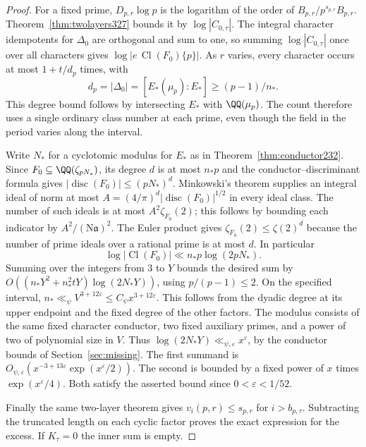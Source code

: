 \documentclass[a4paper,11pt]{article}
\theoremstyle{definition}
\theoremstyle{remark}
\numberwithin{equation}{section}
\newcommand{\Cl}{\operatorname{Cl}}
\begin{document}
\begin{proof}
For a fixed prime, \(D_{p,r}\log p\) is the logarithm
of the order of \(B_{p,r}/p^{s_{p,r}}B_{p,r}\).
Theorem~\ref{thm:twolayers327} bounds it by
\(\log |C_{0,\tau}|\). The integral character idempotents
for \(\Delta_0\) are orthogonal and sum to one, so summing
\(\log |C_{0,\tau}|\) once over all characters gives
\(\log |e\,\Cl(F_0)\{p\}|\). As \(r\) varies, every character
occurs at most \(1+t/d_p\) times, with
\[
 d_p=|\Delta_0|=[E_*(\mu_p):E_*]\ge(p-1)/n_*.
\]
This degree bound follows by intersecting \(E_*\) with
\(\QQ(\mu_p)\). The count therefore uses a single ordinary
class number at each prime, even though the field in the
period varies along the interval.

Write \(N_*\) for a cyclotomic modulus for \(E_*\) as in
Theorem~\ref{thm:conductor232}. Since \(F_0\subseteq
\QQ(\zeta_{pN_*})\), its degree \(d\) is at most \(n_*p\)
and the conductor--discriminant formula gives
\(|\operatorname{disc}(F_0)|\le(pN_*)^d\).
Minkowski's theorem supplies an integral ideal of norm at most
\(A=(4/\pi)^d|\operatorname{disc}(F_0)|^{1/2}\) in every
ideal class. The number of such ideals is at most
\(A^2\zeta_{F_0}(2)\); this follows by bounding each indicator
by \(A^2/(\mathrm N\mathfrak a)^2\). The Euler product gives
\(\zeta_{F_0}(2)\le\zeta(2)^d\) because the number of prime
ideals over a rational prime is at most \(d\).
In particular
\[
 \log|\Cl(F_0)|\ll n_* p\log(2pN_*).
\]
Summing over the integers from 3 to \(Y\) bounds the desired
sum by \(O((n_*Y^2+n_*^2tY)\log(2N_*Y))\), using
\(p/(p-1)\le 2\). On the specified interval,
\(n_*\ll_\psi V^{3+12\varepsilon}\le C_\psi x^{3+12\varepsilon}\).
This follows from the dyadic degree at its upper endpoint and
the fixed degree of the other factors. The modulus consists
of the same fixed character conductor, two fixed auxiliary
primes, and a power of two of polynomial size in \(V\).
Thus \(\log(2N_*Y)\ll_{\psi,\varepsilon}x^\varepsilon\),
by the conductor bounds of Section~\ref{sec:missing}.
The first summand is
\(O_{\psi,\varepsilon}(x^{-3+13\varepsilon}
  \exp(x^\varepsilon/2))\).
The second is bounded by a fixed power of \(x\) times
\(\exp(x^\varepsilon/4)\). Both satisfy the asserted bound
since \(0<\varepsilon<1/52\).

Finally the same two-layer theorem gives
\(v_i(p,r)\le s_{p,r}\) for \(i>b_{p,\tau}\).
Subtracting the truncated length on each cyclic factor proves
the exact expression for the excess. If \(K_\tau=0\) the
inner sum is empty.
\end{proof}
\end{document}
